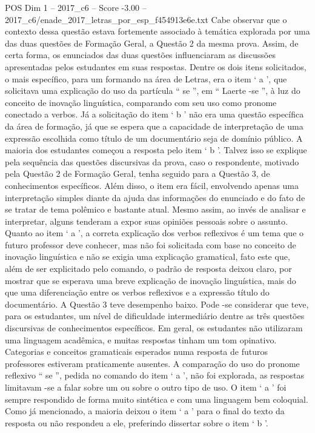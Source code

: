 \begin{textsample}{POS Dim 1 – 2017\_c6 – Score -3.00 – 2017\_c6/enade\_2017\_letras\_por\_esp\_f454913e6e.txt}
Cabe observar que o contexto dessa questão estava fortemente associado à temática explorada por uma das duas questões de Formação Geral, a Questão 2 da mesma prova.
Assim, de certa forma, os enunciados das duas questões influenciaram as discussões apresentadas pelos estudantes em suas respostas.
Dentre os dois itens solicitados, o mais específico, para um formando na área de Letras, era o item ‘ a ’, que solicitava uma explicação do uso da partícula “ se ”, em “ Laerte -se ”, à luz do conceito de inovação linguística, comparando com seu uso como pronome conectado a verbos.
Já a solicitação do item ‘ b ’ não era uma questão específica da área de formação, já que se espera que a capacidade de interpretação de uma expressão escolhida como título de um documentário seja de domínio público.
A maioria dos estudantes começou a resposta pelo item ‘ b ’.
Talvez isso se explique pela sequência das questões discursivas da prova, caso o respondente, motivado pela Questão 2 de Formação Geral, tenha seguido para a Questão 3, de conhecimentos específicos.
Além disso, o item era fácil, envolvendo apenas uma interpretação simples diante da ajuda das informações do enunciado e do fato de se tratar de tema polêmico e bastante atual.
Mesmo assim, ao invés de analisar e interpretar, alguns tenderam a expor suas opiniões pessoais sobre o assunto.
Quanto ao item ‘ a ’, a correta explicação dos verbos reflexivos é um tema que o futuro professor deve conhecer, mas não foi solicitada com base no conceito de inovação linguística e não se exigia uma explicação gramatical, fato este que, além de ser explicitado pelo comando, o padrão de resposta deixou claro, por mostrar que se esperava uma breve explicação de inovação linguística, mais do que uma diferenciação entre os verbos reflexivos e a expressão título do documentário.
A Questão 3 teve desempenho baixo.
Pode -se considerar que teve, para os estudantes, um nível de dificuldade intermediário dentre as três questões discursivas de conhecimentos específicos.
Em geral, os estudantes não utilizaram uma linguagem acadêmica, e muitas respostas tinham um tom opinativo.
Categorias e conceitos gramaticais esperados numa resposta de futuros professores estiveram praticamente ausentes.
A comparação do uso do pronome reflexivo “ se ”, pedida no comando do item ‘ a ’, não foi explorada, as respostas limitavam -se a falar sobre um ou sobre o outro tipo de uso.
O item ‘ a ’ foi sempre respondido de forma muito sintética e com uma linguagem bem coloquial.
Como já mencionado, a maioria deixou o item ‘ a ’ para o final do texto da resposta ou não respondeu a ele, preferindo dissertar sobre o item ‘ b ’.

\end{textsample}
